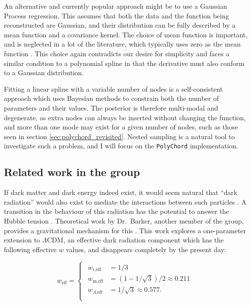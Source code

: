 \documentclass{article}
\begin{document}
An alternative and currently popular approach might be to use a Gaussian Process regression. This assumes that both the data and the function being reconstructed are Gaussian, and their distribution can be fully described by a mean function and a covariance kernel. The choice of mean function is important, and is neglected in a lot of the literature, which typically uses zero as the mean function \cite{GP}. This choice again contradicts our desire for simplicity and faces a similar condition to a polynomial spline in that the derivative must also conform to a Gaussian distribution.

Fitting a linear spline with a variable number of nodes is a self-consistent approach which uses Bayesian methods to constrain both the number of parameters and their values. The posterior is therefore multi-modal and degenerate, as extra nodes can always be inserted without changing the function, and more than one mode may exist for a given number of nodes, such as those seen in section \ref{sec:polychord_revisited}. Nested sampling is a natural tool to investigate such a problem, and I will focus on the \texttt{PolyChord} implementation.

\subsection{Related work in the group}
\label{sec:barker}
If dark matter and dark energy indeed exist, it would seem natural that ``dark radiation'' would also exist to mediate the interactions between such particles \cite{Ackerman_2009}. A transition in the behaviour of this radiation has the potential to answer the Hubble tension \cite{Aloni_2022}. Theoretical work by Dr.~Barker, another member of the group, provides a gravitational mechanism for this \cite{Barker_2020}. This work explores a one-parameter extension to $\Lambda$CDM, an effective dark radiation component which has the following effective $w$ values, and disappears completely by the present day:

\begin{equation}
  \label{eq:dark-barker}
  w_\textrm{eff} = 
  \begin{cases}
    \begin{aligned}
      w_\textrm{r,eff} &= 1/3 \\
      w_\textrm{m,eff} &= (1-1/\sqrt{3}) / 2 \approx 0.211 \\
      w_{\Lambda \textrm{,eff}} &= 1/\sqrt{3} \approx 0.577 \textrm{.} \\
    \end{aligned}
  \end{cases}
\end{equation}
\end{document}
